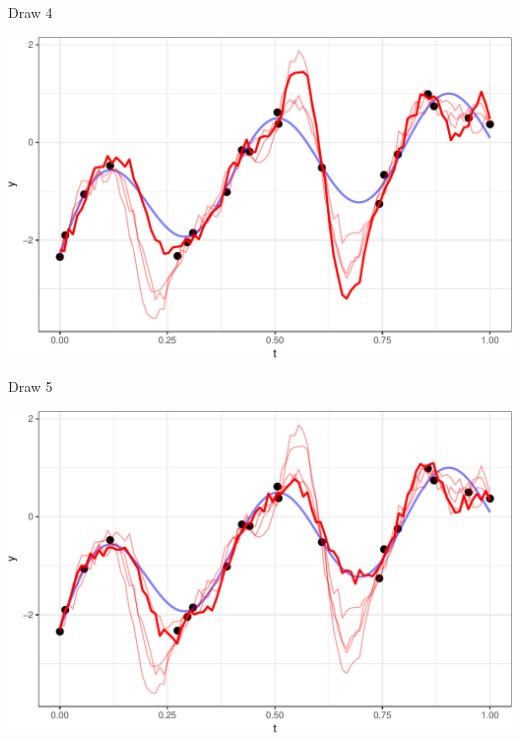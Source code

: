 \documentclass[11pt,ignorenonframetext,]{beamer}
\begin{document}
\begin{frame}{%
\protect\hypertarget{draw-4}{%
Draw 4}}

\begin{center}\includegraphics[width=\textwidth]{Lec12_files/figure-beamer/unnamed-chunk-8-1} \end{center}

\end{frame}

\begin{frame}{%
\protect\hypertarget{draw-5}{%
Draw 5}}

\begin{center}\includegraphics[width=\textwidth]{Lec12_files/figure-beamer/unnamed-chunk-9-1} \end{center}

\end{frame}
\end{document}
